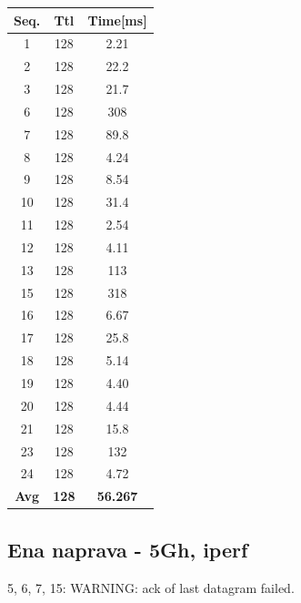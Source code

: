 \documentclass[11pt,a4paper,slovene]{article}
\begin{document}
\begin{table}[H]
	\begin{adjustwidth}{-3cm}{-3cm}
	\centering
		\begin{tabular}{c|c|c}
		\hline
		\textbf{Seq.} & \textbf{Ttl} & \textbf{Time[ms]}\\
     		\hline
     		1 & 128 & 2.21\\
  		2 & 128 & 22.2\\
  		3 & 128 & 21.7\\
  		6 & 128 & 308\\
  		7 & 128 & 89.8\\
  		8 & 128 & 4.24\\
  		9 & 128 & 8.54\\
  		10 & 128 & 31.4\\
  		11 & 128 & 2.54\\
  		12 & 128 & 4.11\\
  		13 & 128 & 113\\
  		15 & 128 & 318\\
  		16 & 128 & 6.67\\
  		17 & 128 & 25.8\\
  		18 & 128 & 5.14\\
  		19 & 128 & 4.40\\
  		20 & 128 & 4.44\\
  		21 & 128 & 15.8\\
  		23 & 128 & 132\\
  		24 & 128 & 4.72\\
  		\hline
  		\textbf{Avg} & \textbf{128} & \textbf{56.267}\\
  		\hline
  		\end{tabular}
    	\end{adjustwidth}
\end{table}

\subsection{Ena naprava - 5Gh, iperf}

5, 6, 7, 15: WARNING: ack of last datagram failed.
\end{document}
